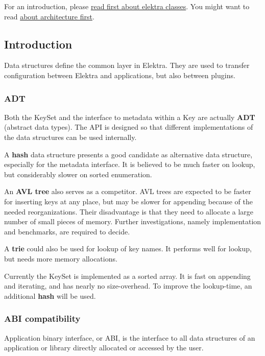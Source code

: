 For an introduction, please \hyperlink{doc_dev_classes_md}{read first about elektra classes}. You might want to read \hyperlink{doc_dev_architecture_md}{about architecture first}.

\subsection*{Introduction}

Data structures define the common layer in Elektra. They are used to transfer configuration between Elektra and applications, but also between plugins.

\subsubsection*{A\+DT}

Both the {\ttfamily Key\+Set} and the interface to metadata within a {\ttfamily Key} are actually {\bfseries A\+DT} (abstract data types). The A\+PI is designed so that different implementations of the data structures can be used internally.

A {\bfseries hash} data structure presents a good candidate as alternative data structure, especially for the metadata interface. It is believed to be much faster on lookup, but considerably slower on sorted enumeration.

An {\bfseries A\+VL tree} also serves as a competitor. A\+VL trees are expected to be faster for inserting keys at any place, but may be slower for appending because of the needed reorganizations. Their disadvantage is that they need to allocate a large number of small pieces of memory. Further investigations, namely implementation and benchmarks, are required to decide.

A {\bfseries trie} could also be used for lookup of key names. It performs well for lookup, but needs more memory allocations.

Currently the {\ttfamily Key\+Set} is implemented as a sorted array. It is fast on appending and iterating, and has nearly no size-\/overhead. To improve the lookup-\/time, an additional {\bfseries hash} will be used.

\subsubsection*{A\+BI compatibility}

Application binary interface, or A\+BI, is the interface to all data structures of an application or library directly allocated or accessed by the user.

